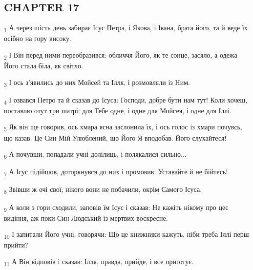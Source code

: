 \subsection{CHAPTER 17}
\begin{tcolorbox}
\textsubscript{1} А через шість день забирає Ісус Петра, і Якова, і Івана, брата його, та й веде їх осібно на гору високу.
\end{tcolorbox}
\begin{tcolorbox}
\textsubscript{2} І Він перед ними переобразився: обличчя Його, як те сонце, засяло, а одежа Його стала біла, як світло.
\end{tcolorbox}
\begin{tcolorbox}
\textsubscript{3} І ось з'явились до них Мойсей та Ілля, і розмовляли із Ним.
\end{tcolorbox}
\begin{tcolorbox}
\textsubscript{4} І озвався Петро та й сказав до Ісуса: Господи, добре бути нам тут! Коли хочеш, поставлю отут три шатрі: для Тебе одне, і одне для Мойсея, і одне для Іллі.
\end{tcolorbox}
\begin{tcolorbox}
\textsubscript{5} Як він ще говорив, ось хмара ясна заслонила їх, і ось голос із хмари почувсь, що казав: Це Син Мій Улюблений, що Його Я вподобав. Його слухайтеся!
\end{tcolorbox}
\begin{tcolorbox}
\textsubscript{6} А почувши, попадали учні долілиць, і полякалися сильно...
\end{tcolorbox}
\begin{tcolorbox}
\textsubscript{7} А Ісус підійшов, доторкнувся до них і промовив: Уставайте й не бійтесь!
\end{tcolorbox}
\begin{tcolorbox}
\textsubscript{8} Звівши ж очі свої, нікого вони не побачили, окрім Самого Ісуса.
\end{tcolorbox}
\begin{tcolorbox}
\textsubscript{9} А коли з гори сходили, заповів їм Ісус і сказав: Не кажіть нікому про цеє видіння, аж поки Син Людський із мертвих воскресне.
\end{tcolorbox}
\begin{tcolorbox}
\textsubscript{10} І запитали Його учні, говорячи: Що це книжники кажуть, ніби треба Іллі перш прийти?
\end{tcolorbox}
\begin{tcolorbox}
\textsubscript{11} А Він відповів і сказав: Ілля, правда, прийде, і все приготує.
\end{tcolorbox}
